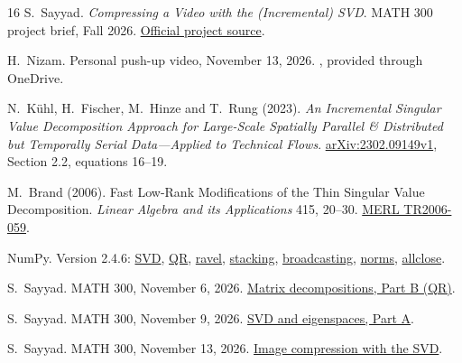 \documentclass[11pt,a4paper]{article}
\begin{document}
\begingroup\small
\setlength{\parskip}{0pt}
\begin{thebibliography}{16}
\setlength{\itemsep}{0pt}
S.~Sayyad. \emph{Compressing a Video with the (Incremental) SVD}.
MATH 300 project brief, Fall 2026.
\href{https://github.com/say-yas/wsu_math300/blob/2242bf2f92da2d12b0ac8d933342b008428daaa1/project_proposals/incremental_svd_project.tex}{Official project source}.

H.~Nizam. Personal push-up video, November 13, 2026.
, provided through OneDrive.

N.~K\"uhl, H.~Fischer, M.~Hinze and T.~Rung (2023).
\emph{An Incremental Singular Value Decomposition Approach for Large-Scale
Spatially Parallel \& Distributed but Temporally Serial Data---Applied to
Technical Flows}. \href{https://arxiv.org/abs/2302.09149v1}{arXiv:2302.09149v1},
Section 2.2, equations 16--19.

M.~Brand (2006). Fast Low-Rank Modifications of the Thin Singular Value
Decomposition. \emph{Linear Algebra and its Applications} 415, 20--30.
\href{https://www.merl.com/publications/TR2006-059}{MERL TR2006-059}.

NumPy. Version 2.4.6:
\href{https://numpy.org/doc/2.4/reference/generated/numpy.linalg.svd.html}{SVD},
\href{https://numpy.org/doc/2.4/reference/generated/numpy.linalg.qr.html}{QR},
\href{https://numpy.org/doc/2.4/reference/generated/numpy.ravel.html}{ravel},
\href{https://numpy.org/doc/2.4/reference/generated/numpy.column_stack.html}{stacking},
\href{https://numpy.org/doc/2.4/user/basics.broadcasting.html}{broadcasting},
\href{https://numpy.org/doc/2.4/reference/generated/numpy.linalg.norm.html}{norms},
\href{https://numpy.org/doc/2.4/reference/generated/numpy.allclose.html}{allclose}.

S.~Sayyad. MATH 300, November 6, 2026.
\href{https://github.com/say-yas/wsu_math300/blob/ef5f38f850dabb9a1f19068884ba4b0fa7bb2a5b/Nov6_decompositions/decompositions.ipynb}{Matrix decompositions, Part B (QR)}.

S.~Sayyad. MATH 300, November 9, 2026.
\href{https://github.com/say-yas/wsu_math300/blob/435aab704ac2701d771769e232c75295ec97bba9/Nov9_SVD_similarity_transformations/svd-eigenspaces.ipynb}{SVD and eigenspaces, Part A}.

S.~Sayyad. MATH 300, November 13, 2026.
\href{https://github.com/say-yas/wsu_math300/blob/2242bf2f92da2d12b0ac8d933342b008428daaa1/Nov13_Imagecompression/svd_image_compression.ipynb}{Image compression with the SVD}.


\end{thebibliography}
\end{document}
